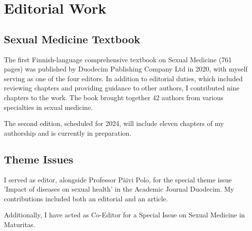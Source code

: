 \documentclass[nobib]{tufte-book}
\begin{document}
\nocite{*}
\renewcommand\bibname{List of Publications of Katja Kero}
\printbibheading

\printbibliography[subtype=thesis,heading=subbibliography,title=Theses,resetnumbers=true]
\printbibliography[subtype=international-peer-reviewed,heading=subbibliography,title=International Peer-Reviewed Articles,resetnumbers=true]
\printbibliography[subtype=book-chapter,heading=subbibliography,title=Book Chapters,resetnumbers=true]
\printbibliography[subtype=finnish-article,heading=subbibliography,title=Finnish Articles,resetnumbers=true]
\printbibliography[subtype=popular-article,heading=subbibliography,title=Popular Articles,resetnumbers=true]

\section*{Editorial Work}

\subsection*{Sexual Medicine Textbook}
The first Finnish-language comprehensive textbook on Sexual Medicine (761 pages) was published by Duodecim Publishing Company Ltd in 2020, with myself serving as one of the four editors. In addition to editorial duties, which included reviewing chapters and providing guidance to other authors, I contributed nine chapters to the work. The book brought together 42 authors from various specialties in sexual medicine.

\medskip

The second edition, scheduled for 2024, will include eleven chapters of my authorship and is currently in preparation.

\subsection*{Theme Issues}
I served as editor, alongside Professor Päivi Polo, for the special theme issue 'Impact of diseases on sexual health' in the Academic Journal Duodecim. My contributions included both an editorial and an article.

\medskip

Additionally, I have acted as Co-Editor for a Special Issue on Sexual Medicine in Maturitas.
\end{document}
